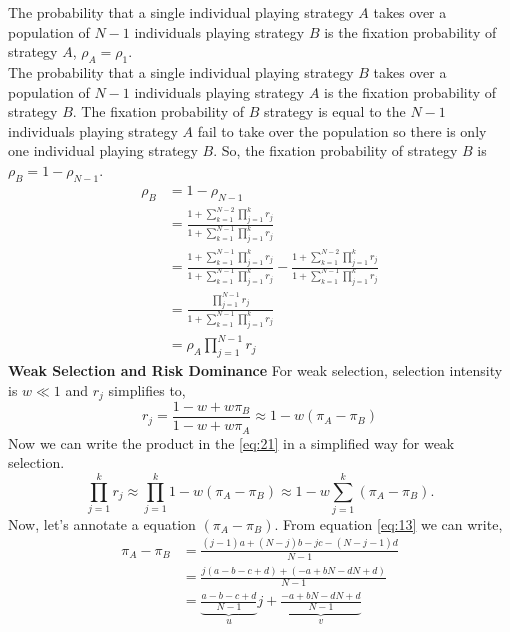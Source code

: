 \documentclass{article}
\begin{document}
The probability that a single individual playing strategy $A$ takes over a population of $N-1$ individuals playing strategy $B$ is the fixation probability of strategy $A$, $\rho_A=\rho_1$.\\
The probability that a single individual playing strategy $B$ takes over a population of $N-1$ individuals playing strategy $A$ is the fixation probability of strategy $B$. The fixation probability of $B$ strategy is equal to the $N-1$ individuals playing strategy $A$ fail to take over the population so there is only one individual playing strategy $B$. So, the fixation probability of strategy $B$ is $\rho_B= 1-\rho_{N-1}$.\citep{traulsen2009stochastic}
\begin{align}
\rho_B &=1-\rho_{N-1} \nonumber\\
&=\frac{1 + \sum_{k=1}^{N-2} \prod_{j=1}^{k} r_j}{1 + \sum_{k=1}^{N-1} \prod_{j=1}^{k} r_j} \nonumber\\
&= \frac{1 + \sum_{k=1}^{N-1} \prod_{j=1}^{k} r_j}{1 + \sum_{k=1}^{N-1} \prod_{j=1}^{k} r_j} - \frac{1 + \sum_{k=1}^{N-2} \prod_{j=1}^{k} r_j}{1 + \sum_{k=1}^{N-1} \prod_{j=1}^{k} r_j} \nonumber\\
&= \frac{\prod_{j=1}^{N-1} r_j}{1 + \sum_{k=1}^{N-1} \prod_{j=1}^{k} r_j} \nonumber \\
&= \rho_A \prod_{j=1}^{N-1} r_j \label{eq:24}
\end{align}
\textbf{Weak Selection and Risk Dominance}
\newline
For weak selection, selection intensity is $w\ll 1$ and $r_j$ simplifies to,
\begin{equation}
r_j = \frac{1-w+w\pi_B}{1-w+w\pi_A} \approx 1-w(\pi_A-\pi_B) \label{eq:25}
\end{equation}
Now we can write the product in the \eqref{eq:21} in a simplified way for weak selection.
\begin{equation}
\prod_{j=1}^k r_j \approx \prod_{j=1}^k 1-w(\pi_A-\pi_B) \approx 1-w \sum_{j=1}^k (\pi_A-\pi_B). \label{eq:26}
\end{equation}
Now, let's annotate a equation $(\pi_A-\pi_B)$.
From equation \eqref{eq:13} we can write,
\begin{align}
\pi_A - \pi_B &= \frac{(j - 1)a + (N - j)b - jc - (N - j - 1)d}{N - 1} \nonumber\\
&= \frac{j(a - b - c + d) + (-a + bN - dN + d)}{N - 1}\nonumber\\
&= \underbrace{\frac{a - b - c + d}{N - 1}}_{u} j 
+ \underbrace{\frac{-a + bN - dN + d}{N - 1}}_{v} \label{eq:27}
\end{align}
\end{document}
